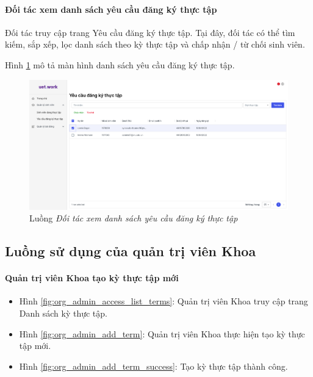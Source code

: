\documentclass[./../main.tex]{subfiles}
\begin{document}
\paragraph*{Đối tác xem danh sách yêu cầu đăng ký thực tập}

Đối tác truy cập trang Yêu cầu đăng ký thực tập. Tại đây, đối tác có thể tìm kiếm, sắp xếp, lọc danh sách theo kỳ thực tập và chấp nhận / từ chối sinh viên.

Hình \ref{fig:partner_view_list_requests_page} mô tả màn hình danh sách yêu cầu đăng ký thực tập.

\begin{figure}[]
	\includegraphics[width=\linewidth]{./images/image29.png}
	\caption{Luồng \emph{Đối tác xem danh sách yêu cầu đăng ký thực tập}}
	\label{fig:partner_view_list_requests_page}
\end{figure}

\subsection{Luồng sử dụng của quản trị viên Khoa}

\paragraph*{Quản trị viên Khoa tạo kỳ thực tập mới}

\begin{itemize}
	\item Hình \ref{fig:org_admin_access_list_terms}: Quản trị viên Khoa truy cập trang Danh sách kỳ thực tập. 
	\item Hình \ref{fig:org_admin_add_term}: Quản trị viên Khoa thực hiện tạo kỳ thực tập mới.
	\item Hình \ref{fig:org_admin_add_term_success}: Tạo kỳ thực tập thành công.
\end{itemize}
\end{document}
